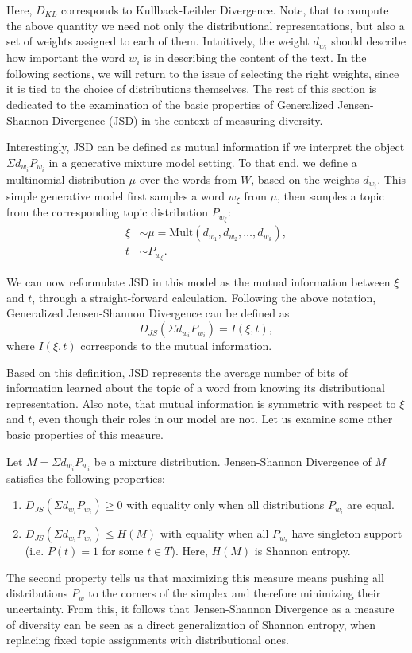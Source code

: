 Here, $D_{KL}$ corresponds to Kullback-Leibler Divergence.
Note, that to compute the above quantity we need not only the
distributional representations, but also a set of weights assigned to
each of them. Intuitively, the weight $d_{w_i}$ should describe how
important the word $w_i$ is in describing the content of the text. In
the following sections, we will return to the issue of selecting the
right weights, since it is tied to the choice of distributions
themselves. The rest of this section is dedicated to the examination of the
basic properties of Generalized Jensen-Shannon Divergence (JSD) in the
context of measuring diversity. 

Interestingly, JSD can be defined as mutual information if we
interpret the object $\Sigma d_{w_i}P_{w_i}$ in a generative mixture
model setting. To that end, we define a multinomial distribution
$\mu$ over the words from $W$, based on the weights $d_{w_i}$. This
simple generative model first samples a word $w_\xi$ from $\mu$, then samples a
topic from the corresponding topic distribution $P_{w_\xi}$:
\begin{align*}
\xi &\sim \mu=\textrm{Mult}(d_{w_1},d_{w_2},\dots,d_{w_k}),\\
t &\sim P_{w_\xi}.
\end{align*}

We can now reformulate JSD in this model as the mutual information
between $\xi$ and $t$, through a straight-forward calculation.
\bep
Following the above notation, Generalized Jensen-Shannon Divergence
can be defined as
\[D_{JS}(\Sigma d_{w_i}P_{w_i})= I(\xi,t),\]
where $I(\xi,t)$ corresponds to the mutual information.
\eep

Based on this definition, JSD represents the average number of bits of
information learned about the topic of a word from knowing its
distributional representation. Also note, that mutual information is
symmetric with respect to $\xi$ and $t$, even though their roles in
our model are not. Let us examine some other basic properties of this
measure. 

\bep\label{jsd-properties}
Let $M=\Sigma d_{w_i} P_{w_i}$ be a mixture distribution. Jensen-Shannon
Divergence of $M$ satisfies the following properties:
 \begin{enumerate}
   \item $D_{JS}(\Sigma d_{w_i}P_{w_i})\geq 0$ with equality only when all
     distributions $P_{w_i}$ are equal.
   \item $D_{JS}(\Sigma d_{w_i}P_{w_i})\leq H(M)$ with equality when all
     $P_{w_i}$ have singleton support (i.e. $P(t)=1$ for some $t\in
     T$). Here, $H(M)$ is Shannon entropy.
 \end{enumerate}
\eep
The second property tells us that maximizing this measure means
pushing all distributions $P_w$ to the corners of the simplex and
therefore minimizing their uncertainty. From this, it follows that
Jensen-Shannon Divergence as a measure of diversity can be seen as a
direct generalization of Shannon entropy, when replacing fixed topic
assignments with distributional ones.  
